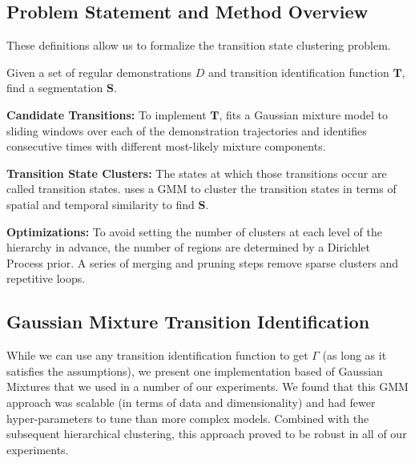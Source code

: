 \subsection*{Problem Statement and Method Overview}\label{ps}
These definitions allow us to formalize the transition state clustering problem. 

\begin{problem}
Given a set of regular demonstrations $D$ and transition identification function $\mathbf{T}$, find a segmentation $\mathbf{S}$.
\end{problem}

\noindent \textbf{Candidate Transitions: } To implement $\mathbf{T}$, \tsc fits a Gaussian mixture model to sliding windows over each of the demonstration trajectories and identifies consecutive times with different most-likely mixture components.

\vspace{0.25em}

\noindent \textbf{Transition State Clusters: } The states at which those transitions occur are called transition states.
\tsc uses a GMM to cluster the transition states in terms of spatial and temporal similarity to find $\mathbf{S}$.

\vspace{0.25em}

\noindent \textbf{Optimizations: } To avoid setting the number of clusters at each level of the hierarchy in advance, the number of regions are determined by a Dirichlet Process prior.
A series of merging and pruning steps remove sparse clusters and repetitive loops.

\subsection*{Gaussian Mixture Transition Identification}
While we can use any transition identification function to get $\Gamma$ (as long as it satisfies the assumptions), we present one implementation based of Gaussian Mixtures that we used in a number of our experiments.
We found that this GMM approach was scalable (in terms of data and dimensionality) and had fewer hyper-parameters to tune than more complex models.
Combined with the subsequent hierarchical clustering, this approach proved to be robust in all of our experiments.

